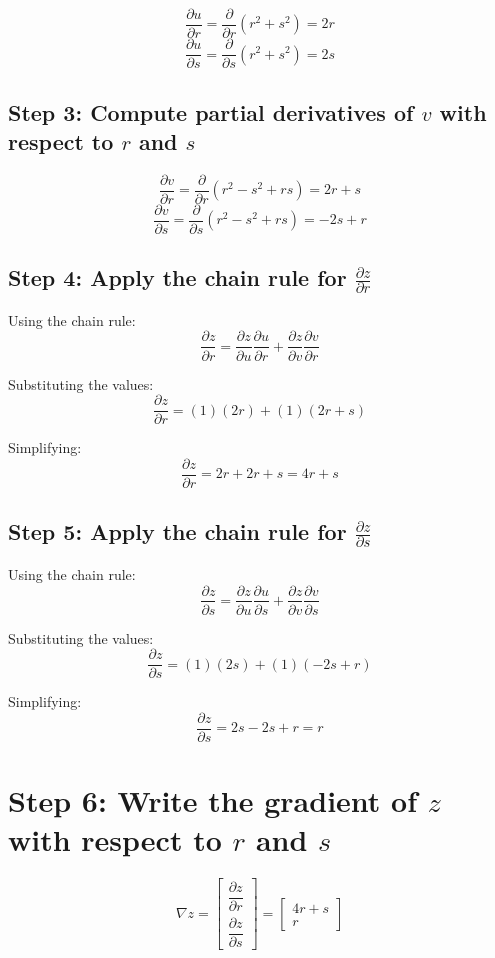\documentclass{tufte-handout}
\begin{document}
\[
\frac{\partial u}{\partial r} = \frac{\partial}{\partial r}(r^2 + s^2) = 2r
\]
\[
\frac{\partial u}{\partial s} = \frac{\partial}{\partial s}(r^2 + s^2) = 2s
\]

\subsection*{Step 3: Compute partial derivatives of $v$ with respect to $r$ and $s$}

\[
\frac{\partial v}{\partial r} = \frac{\partial}{\partial r}(r^2 - s^2 + rs) = 2r + s
\]
\[
\frac{\partial v}{\partial s} = \frac{\partial}{\partial s}(r^2 - s^2 + rs) = -2s + r
\]

\subsection*{Step 4: Apply the chain rule for $\frac{\partial z}{\partial r}$}

Using the chain rule:
\[
\frac{\partial z}{\partial r} = \frac{\partial z}{\partial u}\frac{\partial u}{\partial r} + \frac{\partial z}{\partial v}\frac{\partial v}{\partial r}
\]

Substituting the values:
\[
\frac{\partial z}{\partial r} = (1)(2r) + (1)(2r + s)
\]

Simplifying:
\[
\frac{\partial z}{\partial r} = 2r + 2r + s = 4r + s
\]

\subsection*{Step 5: Apply the chain rule for $\frac{\partial z}{\partial s}$}

Using the chain rule:
\[
\frac{\partial z}{\partial s} = \frac{\partial z}{\partial u}\frac{\partial u}{\partial s} + \frac{\partial z}{\partial v}\frac{\partial v}{\partial s}
\]

Substituting the values:
\[
\frac{\partial z}{\partial s} = (1)(2s) + (1)(-2s + r)
\]

Simplifying:
\[
\frac{\partial z}{\partial s} = 2s - 2s + r = r
\]

\section*{Step 6: Write the gradient of $z$ with respect to $r$ and $s$}

\[
\nabla z = \begin{bmatrix} 
\dfrac{\partial z}{\partial r} \\[1em]
\dfrac{\partial z}{\partial s}
\end{bmatrix} = \begin{bmatrix}
4r + s \\
r
\end{bmatrix}
\]
\end{document}
